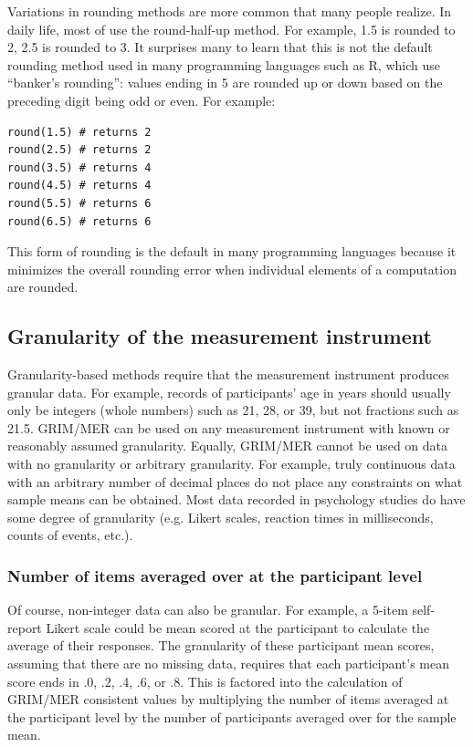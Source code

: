 \documentclass[letterpaper, 12pt]{article}
\begin{document}
{Variations in rounding methods are more common that many people realize. In daily life, most of use the round-half-up method. For example, 1.5 is rounded to 2, 2.5 is rounded to 3. It surprises many to learn that this is not the default rounding method used in many programming languages such as R, which use ``banker's rounding'': values ending in 5 are rounded up or down based on the preceding digit being odd or even. For example:
\begin{verbatim}
round(1.5) # returns 2
round(2.5) # returns 2
round(3.5) # returns 4
round(4.5) # returns 4
round(5.5) # returns 6
round(6.5) # returns 6
\end{verbatim}
This form of rounding is the default in many programming languages because it minimizes the overall rounding error when individual elements of a computation are rounded.

\subsection*{Granularity of the measurement instrument}

Granularity-based methods require that the measurement instrument produces granular data. For example, records of participants' age in years should usually only be integers (whole numbers) such as 21, 28, or 39, but not fractions such as 21.5. GRIM/MER can be used on any measurement instrument with known or reasonably assumed granularity. Equally, GRIM/MER cannot be used on data with no granularity or arbitrary granularity. For example, truly continuous data with an arbitrary number of decimal places do not place any constraints on what sample means can be obtained. Most data recorded in psychology studies do have some degree of granularity (e.g. Likert scales, reaction times in milliseconds, counts of events, etc.).

\subsubsection*{Number of items averaged over at the participant level}

Of course, non-integer data can also be granular. For example, a 5-item self-report Likert scale could be mean scored at the participant to calculate the average of their responses. The granularity of these participant mean scores, assuming that there are no missing data, requires that each participant's mean score ends in .0, .2, .4, .6, or .8. This is factored into the calculation of GRIM/MER consistent values by multiplying the number of items averaged at the participant level by the number of participants averaged over for the sample mean.

}
\end{document}
